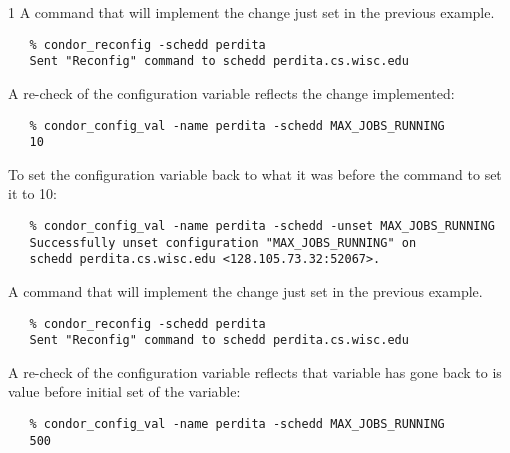 \begin{ManPage}{\label{man-condor-config-val}}{1}
A command that will implement the change just set in the previous
example.
\begin{verbatim}
   % condor_reconfig -schedd perdita
   Sent "Reconfig" command to schedd perdita.cs.wisc.edu
\end{verbatim}

A re-check of the configuration variable reflects the change implemented:
\begin{verbatim}
   % condor_config_val -name perdita -schedd MAX_JOBS_RUNNING
   10
\end{verbatim}

To set the configuration variable 
back to what it was before the command to set it to 10:
\begin{verbatim}
   % condor_config_val -name perdita -schedd -unset MAX_JOBS_RUNNING
   Successfully unset configuration "MAX_JOBS_RUNNING" on 
   schedd perdita.cs.wisc.edu <128.105.73.32:52067>.
\end{verbatim}

A command that will implement the change just set in the previous
example.
\begin{verbatim}
   % condor_reconfig -schedd perdita
   Sent "Reconfig" command to schedd perdita.cs.wisc.edu
\end{verbatim}

A re-check of the configuration variable reflects that variable
has gone back to is value before initial set of the variable:
\begin{verbatim}
   % condor_config_val -name perdita -schedd MAX_JOBS_RUNNING
   500
\end{verbatim}

\end{ManPage}
